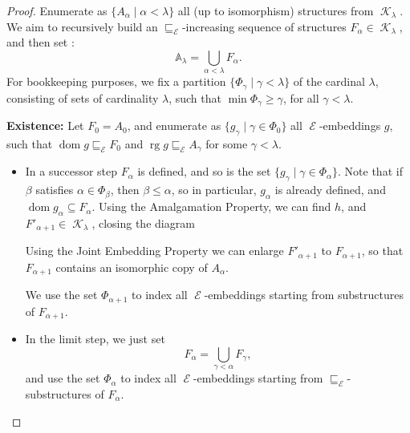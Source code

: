 \documentclass[11pt]{amsart}
\theoremstyle{definition}
\DeclareMathOperator{\K}{\mathcal K}
\DeclareMathOperator{\E}{\mathcal E}
\newcommand{\rg}{\operatorname{rg}}
\newcommand{\dom}{\operatorname{dom}}
\begin{document}
\begin{proof}
Enumerate as $\{A_\alpha \mid \alpha<\lambda \}$ all (up to isomorphism) structures from $\K_\lambda$. We aim to recursively build an $\sqsubseteq_{\E}$-increasing sequence of structures $F_\alpha \in \K_\lambda$, and then set :
    $$\mathbb A_\lambda=\bigcup_{\alpha<\lambda}F_\alpha.$$
    For bookkeeping purposes, we fix a partition $\{\Phi_\gamma \mid \gamma<\lambda \}$ of the cardinal $\lambda$, consisting of sets of cardinality $\lambda$, such that $\min{\Phi_\gamma}\ge \gamma$, for all $\gamma < \lambda$.
	\vspace{1em}
    
	\textbf{Existence:} Let $F_0=A_0$, and enumerate as $\{g_\gamma \mid \gamma \in \Phi_0 \}$ all $\E$-embeddings $g$, such that $\dom{g}\sqsubseteq_{\E} F_0$ and $\rg{g} \sqsubseteq_{\E} A_\gamma$ for some $\gamma<\lambda$.
	
	\begin{itemize}
	\item  In a successor step $F_\alpha$ is defined, and so is the set $\{g_\gamma \mid \gamma \in \Phi_\alpha \}$. Note that if $\beta$ satisfies $\alpha \in \Phi_\beta$, then $\beta \leq \alpha$, so in particular, $g_\alpha$ is already defined, and $\dom{g_\alpha}\subseteq F_\alpha$. Using the Amalgamation Property, we can find $h$, and $F'_{\alpha+1}\in \K_\lambda$, closing the diagram
	\begin{center}
		
		
	\end{center}
	
	Using the Joint Embedding Property we can enlarge $F'_{\alpha+1}$ to $F_{\alpha+1}$, so that $F_{\alpha+1}$ contains an isomorphic copy of $A_\alpha$. 
    
    We use the set $\Phi_{\alpha+1}$ to index all $\E$-embeddings starting from substructures of $F_{\alpha+1}$.
	
	\item In the limit step, we just set 
    $$F_\alpha=\bigcup_{\gamma<\alpha}F_\gamma,$$
    and use the set $\Phi_{\alpha}$ to index all $\E$-embeddings starting from $\sqsubseteq_{\E}$-substructures of $F_{\alpha}$.
	

\end{itemize}
\end{proof}
\end{document}
